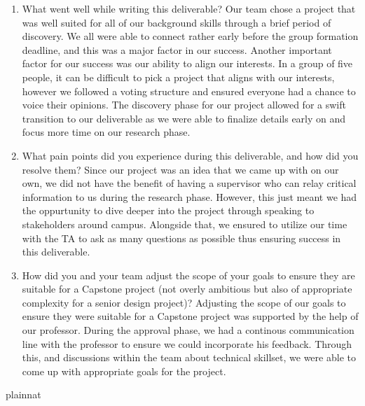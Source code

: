 \documentclass{article}
\begin{document}
\begin{enumerate}
    \item What went well while writing this deliverable? 
    Our team chose a project that was well suited for all of our background skills 
    through a brief period of discovery. We all were able to connect rather early before
    the group formation deadline, and this was a major factor in our success. Another important
    factor for our success was our ability to align our interests. In a group of five people, it
    can be difficult to pick a project that aligns with our interests, however we followed a voting 
    structure and ensured everyone had a chance to voice their opinions. The discovery phase for our 
    project allowed for a swift transition to our deliverable as we were able to finalize details early 
    on and focus more time on our research phase.
    \item What pain points did you experience during this deliverable, and how
    did you resolve them?
    Since our project was an idea that we came up with on our own, we did not have the benefit of having a supervisor 
    who can relay critical information to us during the research phase. However, this just meant we had the oppurtunity
    to dive deeper into the project through speaking to stakeholders around campus. Alongside that, we ensured to utilize our time 
    with the TA to ask as many questions as possible thus ensuring success in this deliverable.
    \item How did you and your team adjust the scope of your goals to ensure
    they are suitable for a Capstone project (not overly ambitious but also of
    appropriate complexity for a senior design project)?
    Adjusting the scope of our goals to ensure they were suitable for a Capstone project was supported by the help of our professor. During 
    the approval phase, we had a continous communication line with the professor to ensure we could incorporate his feedback. Through this, 
    and discussions within the team about technical skillset, we were able to come up with appropriate goals for the project.
    
\end{enumerate}  

 {plainnat}

\end{document}
